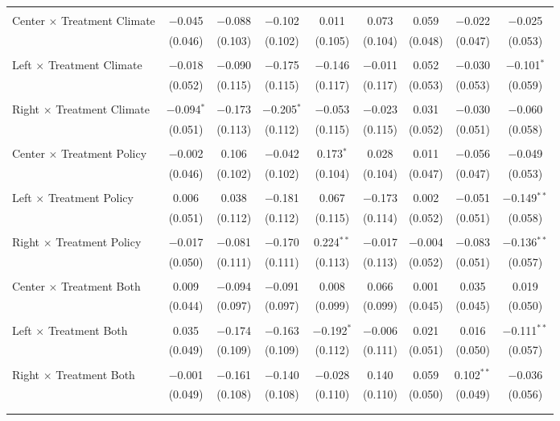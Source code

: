 \begin{tabular}{@{\extracolsep{5pt}}lcccccccc}
  & & & & & & & & \\ 
 Center $\times$ Treatment Climate & $-$0.045 & $-$0.088 & $-$0.102 & 0.011 & 0.073 & 0.059 & $-$0.022 & $-$0.025 \\ 
  & (0.046) & (0.103) & (0.102) & (0.105) & (0.104) & (0.048) & (0.047) & (0.053) \\ 
  & & & & & & & & \\ 
 Left $\times$ Treatment Climate & $-$0.018 & $-$0.090 & $-$0.175 & $-$0.146 & $-$0.011 & 0.052 & $-$0.030 & $-$0.101$^{*}$ \\ 
  & (0.052) & (0.115) & (0.115) & (0.117) & (0.117) & (0.053) & (0.053) & (0.059) \\ 
  & & & & & & & & \\ 
 Right $\times$ Treatment Climate & $-$0.094$^{*}$ & $-$0.173 & $-$0.205$^{*}$ & $-$0.053 & $-$0.023 & 0.031 & $-$0.030 & $-$0.060 \\ 
  & (0.051) & (0.113) & (0.112) & (0.115) & (0.115) & (0.052) & (0.051) & (0.058) \\ 
  & & & & & & & & \\ 
 Center $\times$ Treatment Policy & $-$0.002 & 0.106 & $-$0.042 & 0.173$^{*}$ & 0.028 & 0.011 & $-$0.056 & $-$0.049 \\ 
  & (0.046) & (0.102) & (0.102) & (0.104) & (0.104) & (0.047) & (0.047) & (0.053) \\ 
  & & & & & & & & \\ 
 Left $\times$ Treatment Policy & 0.006 & 0.038 & $-$0.181 & 0.067 & $-$0.173 & 0.002 & $-$0.051 & $-$0.149$^{**}$ \\ 
  & (0.051) & (0.112) & (0.112) & (0.115) & (0.114) & (0.052) & (0.051) & (0.058) \\ 
  & & & & & & & & \\ 
 Right $\times$ Treatment Policy & $-$0.017 & $-$0.081 & $-$0.170 & 0.224$^{**}$ & $-$0.017 & $-$0.004 & $-$0.083 & $-$0.136$^{**}$ \\ 
  & (0.050) & (0.111) & (0.111) & (0.113) & (0.113) & (0.052) & (0.051) & (0.057) \\ 
  & & & & & & & & \\ 
 Center $\times$ Treatment Both & 0.009 & $-$0.094 & $-$0.091 & 0.008 & 0.066 & 0.001 & 0.035 & 0.019 \\ 
  & (0.044) & (0.097) & (0.097) & (0.099) & (0.099) & (0.045) & (0.045) & (0.050) \\ 
  & & & & & & & & \\ 
 Left $\times$ Treatment Both & 0.035 & $-$0.174 & $-$0.163 & $-$0.192$^{*}$ & $-$0.006 & 0.021 & 0.016 & $-$0.111$^{**}$ \\ 
  & (0.049) & (0.109) & (0.109) & (0.112) & (0.111) & (0.051) & (0.050) & (0.057) \\ 
  & & & & & & & & \\ 
 Right $\times$ Treatment Both & $-$0.001 & $-$0.161 & $-$0.140 & $-$0.028 & 0.140 & 0.059 & 0.102$^{**}$ & $-$0.036 \\ 
  & (0.049) & (0.108) & (0.108) & (0.110) & (0.110) & (0.050) & (0.049) & (0.056) \\ 
  & & & & & & & & \\ 
\hline \\[-1.8ex] 


\end{tabular}
